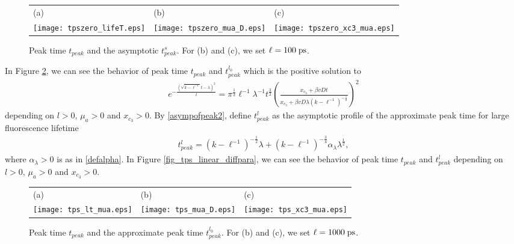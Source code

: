 \documentclass[10pt]{article}
\numberwithin{equation}{section}
\numberwithin{figure}{section}
\begin{document}
\begin{figure}[htp]
\centering
\begin{tabular}{lll}
(a) & (b) & (c) \\
\texttt{[image: tpszero\_lifeT.eps]}
& \texttt{[image: tpszero\_mua\_D.eps]}
& \texttt{[image: tpszero\_xc3\_mua.eps]}
\end{tabular}
\caption{Peak time $t_{peak}$ and the asymptotic $t_{peak}^s$. For (b) and (c), we set $\ell = 100 \; {\rm ps}$.}
\label{fig_tpszero_diffpara}
\end{figure}

In Figure \ref{fig_tps_diffpara}, we can see the behavior of peak time $t_{peak}$ and $t_{peak}^{l_0}$ which is the positive solution to
\begin{equation*}
\begin{split}
 e^{-\frac{(\sqrt{k-\ell^{-1}}t-\lambda)^2}{t}} = \pi^{\frac{1}{2}} \ell^{-1} \lambda^{-1} t^{\frac{3}{2}} \left(\frac{x_{c_3}+\beta vDt }{x_{c_3}+\beta vD \lambda (k-\ell^{-1})^{-\frac{1}{2}}}\right)^2
\end{split}
\end{equation*}
depending on $l>0$, $\mu_a>0$ and $x_{c_3}>0$. By \eqref{asympofpeak2}, define $t_{peak}^l$ as the asymptotic profile of the approximate peak time for large fluorescence lifetime
\begin{equation}\label{asymptotic2}
\begin{split}
t_{peak}^l = (k-\ell^{-1})^{-\frac{1}{2}} \lambda + (k-\ell^{-1})^{-\frac{3}{4}} \alpha_\lambda \lambda^\frac{1}{2},
\end{split}
\end{equation}
where $\alpha_\lambda>0$ is as in \eqref{defalpha}.
In Figure \ref{fig_tps_linear_diffpara}, we can see the behavior of peak time $t_{peak}$ and $t_{peak}^{l}$ depending on $l>0$, $\mu_a>0$ and $x_{c_3}>0$.

\begin{figure}[htp]
\centering
\begin{tabular}{lll}
(a) & (b) & (c) \\
\texttt{[image: tps\_lt\_mua.eps]}
& \texttt{[image: tps\_mua\_D.eps]}
& \texttt{[image: tps\_xc3\_mua.eps]}
\end{tabular}
\caption{Peak time $t_{peak}$ and the approximate peak time $t_{peak}^{l_0}$. For (b) and (c), we set $\ell = 1000 \; {\rm ps}$.}
\label{fig_tps_diffpara}
\end{figure}
\end{document}
